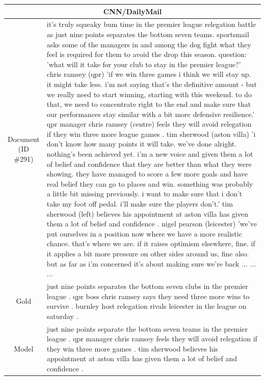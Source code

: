 \begin{table}[bth!]
\scriptsize
\centering
\renewcommand{\arraystretch}{1.3}
\begin{tabular}{c|p{}}
\hline
\multicolumn{2}{c}{CNN/DailyMail} \\ \hline
\makecell{Document\\(ID \#291)} & 
it's truly squeaky bum time in the premier league relegation battle as just nine points separates the bottom seven teams. sportsmail asks some of the managers in and among the dog fight what they feel is required for them to avoid the drop this season. question: 'what will it take for your club to stay in the premier league?' chris ramsey (qpr) 'if we win three games i think we will stay up. it might take less. i'm not saying that's the definitive amount - but we really need to start winning, starting with this weekend. to do that, we need to concentrate right to the end and make sure that our performances stay similar with a bit more defensive resilience.' qpr manager chris ramsey (centre) feels they will avoid relegation if they win three more league games . tim sherwood (aston villa) 'i don't know how many points it will take. we've done alright. nothing's been achieved yet. i'm a new voice and given them a lot of belief and confidence that they are better than what they were showing. they have managed to score a few more goals and have real belief they can go to places and win. something was probably a little bit missing previously. i want to make sure that i don't take my foot off pedal. i'll make sure the players don't.' tim sherwood (left) believes his appointment at aston villa has given them a lot of belief and confidence . nigel pearson (leicester) 'we've put ourselves in a position now where we have a more realistic chance. that's where we are. if it raises optimism elsewhere, fine. if it applies a bit more pressure on other sides around us, fine also. but as far as i'm concerned it's about making sure we're back ... ... ... 
\\ \hline
Gold & 
just nine points separates the bottom seven clubs in the premier league . qpr boss chris ramsey says they need three more wins to survive . burnley host relegation rivals leicester in the league on saturday .
\\ \hline
Model & 
just nine points separate the bottom seven teams in the premier league . qpr manager chris ramsey feels they will avoid relegation if they win three more games . tim sherwood believes his appointment at aston villa has given them a lot of belief and confidence .

\end{tabular}
\end{table}
